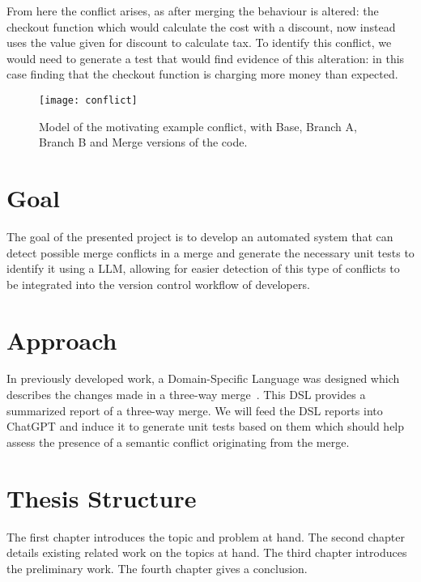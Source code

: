 From here the conflict arises, as after merging the behaviour is altered: the checkout function which would calculate the cost with a discount, now instead uses the value given for discount to calculate tax. To identify this conflict, we would need to generate a test that would find evidence of this alteration: in this case finding that the checkout function is charging more money than expected.

\begin{figure}[t]
    \texttt{[image: conflict]}
    \caption{Model of the motivating example conflict, with Base, Branch A, Branch B and Merge versions of the code.}
    \label{fig:conflict}
\end{figure}

\section{Goal} \label{sec:goal}

The goal of the presented project is to develop an automated system that can detect possible merge conflicts in a merge and generate the necessary unit tests to identify it using a LLM, allowing for easier detection of this type of conflicts to be integrated into the version control workflow of developers.

\section{Approach} \label{sec:approach}

In previously developed work, a Domain-Specific Language was designed which describes the changes made in a three-way merge~\citep{kn:nuno}. This DSL provides a summarized report of a three-way merge. We will feed the DSL reports into ChatGPT and induce it to generate unit tests based on them which should help assess the presence of a semantic conflict originating from the merge.






\section{Thesis Structure} \label{sec:struct}


The first chapter introduces the topic and problem at hand.
The second chapter details existing related work on the topics at hand.
The third chapter introduces the preliminary work.
The fourth chapter gives a conclusion.